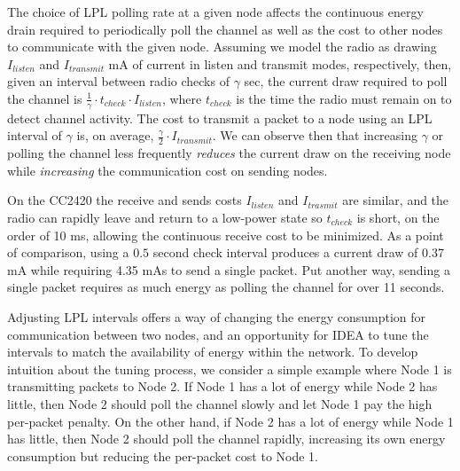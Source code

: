 \documentclass{sig-alternate}
\begin{document}
The choice of LPL polling rate at a given node affects the continuous energy
drain required to periodically poll the channel as well as the cost to other
nodes to communicate with the given node. Assuming we model the radio as
drawing $I_{listen}$ and $I_{transmit}$ mA of current in listen and transmit
modes, respectively, then, given an interval between radio checks of $\gamma$
sec, the current draw required to poll the channel is $\frac{1}{\gamma} \cdot
t_{check} \cdot I_{listen}$, where $t_{check}$ is the time the radio must
remain on to detect channel activity. The cost to transmit a packet to a node
using an LPL interval of $\gamma$ is, on average, $\frac{\gamma}{2} \cdot
I_{transmit}$. We can observe then that increasing $\gamma$ or polling the
channel less frequently \textit{reduces} the current draw on the receiving
node while \textit{increasing} the communication cost on sending nodes.

On the CC2420 the receive and sends costs $I_{listen}$ and $I_{trasmit}$ are
similar, and the radio can rapidly leave and return to a low-power state so
$t_{check}$ is short, on the order of 10 ms, allowing the continuous receive
cost to be minimized. As a point of comparison, using a $0.5$ second check
interval produces a current draw of 0.37 mA while requiring 4.35 mAs to send
a single packet. Put another way, sending a single packet requires as much
energy as polling the channel for over 11 seconds.

Adjusting LPL intervals offers a way of changing the energy consumption for
communication between two nodes, and an opportunity for IDEA to tune the
intervals to match the availability of energy within the network. To develop
intuition about the tuning process, we consider a simple example where Node 1
is transmitting packets to Node 2. If Node 1 has a lot of energy while Node 2
has little, then Node 2 should poll the channel slowly and let Node 1 pay the
high per-packet penalty. On the other hand, if Node 2 has a lot of energy
while Node 1 has little, then Node 2 should poll the channel rapidly,
increasing its own energy consumption but reducing the per-packet cost to
Node 1.
\end{document}
